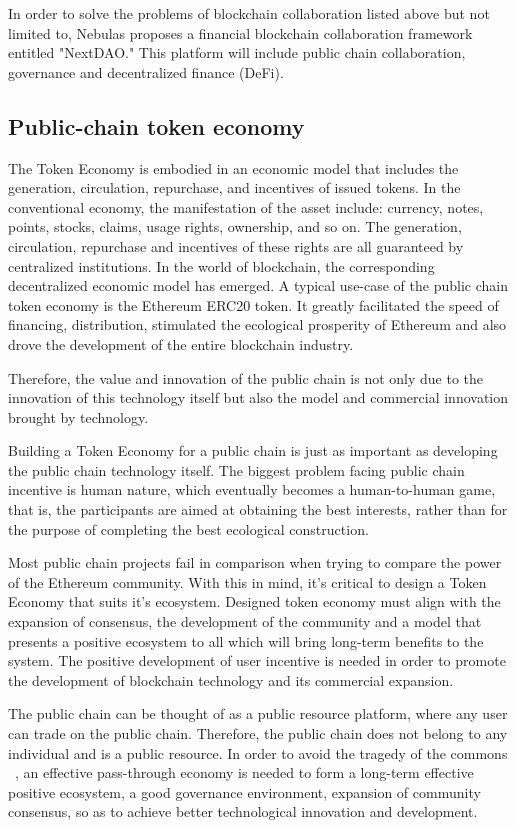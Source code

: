 In order to solve the problems of blockchain collaboration listed above but not limited to, Nebulas proposes a financial blockchain collaboration framework entitled "NextDAO." This platform will include public chain collaboration, governance and decentralized finance (DeFi).

\subsection{Public-chain token economy}
The Token Economy is embodied in an economic model that includes the generation, circulation, repurchase, and incentives of issued tokens. In the conventional economy, the manifestation of the asset include: currency, notes, points, stocks, claims, usage rights, ownership, and so on. The generation, circulation, repurchase and incentives of these rights are all guaranteed by centralized institutions. In the world of blockchain, the corresponding decentralized economic model has emerged. A typical use-case of the public chain token economy is the Ethereum ERC20 token. It greatly facilitated the speed of financing, distribution, stimulated the ecological prosperity of Ethereum and also drove the development of the entire blockchain industry. 

Therefore, the value and innovation of the public chain is not only due to the innovation of this technology itself but also the model and commercial innovation brought by technology.

Building a Token Economy for a public chain is just as important as developing the public chain technology itself. The biggest problem facing public chain incentive is human nature, which eventually becomes a human-to-human game, that is, the participants are aimed at obtaining the best interests, rather than for the purpose of completing the best ecological construction. 

Most public chain projects fail in comparison when trying to compare the power of the Ethereum community. With this in mind, it's critical to design a Token Economy that suits it's ecosystem. Designed token economy must align with the expansion of consensus, the development of the community and a model that presents a positive ecosystem to all which will bring long-term benefits to the system. The positive development of user incentive is needed in order to promote the development of blockchain technology and its commercial expansion.

The public chain can be thought of as a public resource platform, where any user can trade on the public chain. Therefore, the public chain does not belong to any individual and is a public resource. In order to avoid the tragedy of the commons ~\cite{TragedyOfTheCommons}, an effective pass-through economy is needed to form a long-term effective positive ecosystem, a good governance environment, expansion of community consensus, so as to achieve better technological innovation and development.

